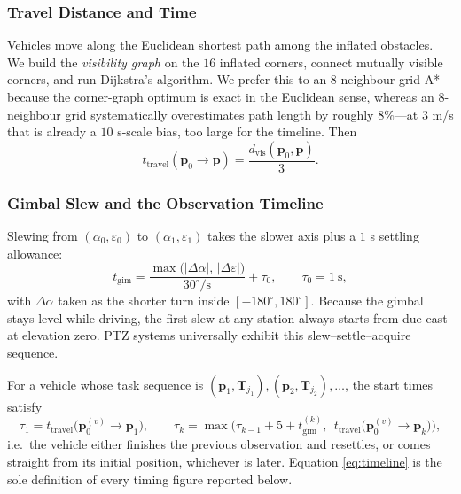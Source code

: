 \documentclass[12pt]{article}
\begin{document}
\subsubsection{Travel Distance and Time}

Vehicles move along the Euclidean shortest path among the inflated obstacles. We build the \emph{visibility graph} on the $16$ inflated corners, connect mutually visible corners, and run Dijkstra's algorithm\cite{dijkstra1959,lozano1979,kapoor1988vis}. We prefer this to an $8$-neighbour grid A* because the corner-graph optimum is exact in the Euclidean sense, whereas an $8$-neighbour grid systematically overestimates path length by roughly $8\%$---at $3$ m/s that is already a $10$ s-scale bias, too large for the timeline. Then
\begin{equation}
\label{eq:travel}
t_{\mathrm{travel}}(\bm p_0\to\bm p)=\frac{d_{\mathrm{vis}}(\bm p_0,\bm p)}{3}.
\end{equation}

\subsubsection{Gimbal Slew and the Observation Timeline}

Slewing from $(\alpha_0,\varepsilon_0)$ to $(\alpha_1,\varepsilon_1)$ takes the slower axis plus a $1$ s settling allowance:
\begin{equation}
\label{eq:gimbal}
t_{\mathrm{gim}}=\frac{\max\big(|\Delta\alpha|,\,|\Delta\varepsilon|\big)}{30^\circ/\mathrm{s}}+\tau_0,
\qquad \tau_0=1\ \mathrm{s},
\end{equation}
with $\Delta\alpha$ taken as the shorter turn inside $[-180^\circ,180^\circ]$. Because the gimbal stays level while driving, the first slew at any station always starts from due east at elevation zero. PTZ systems universally exhibit this slew--settle--acquire sequence\cite{kumar2009ptz,sasiadek2008vision}.

For a vehicle whose task sequence is $(\bm p_1,\bm T_{j_1}),(\bm p_2,\bm T_{j_2}),\dots$, the start times satisfy
\begin{equation}
\label{eq:timeline}
\tau_1=t_{\mathrm{travel}}\big(\bm p_0^{(v)}\to\bm p_1\big),\qquad
\tau_k=\max\Big(\tau_{k-1}+5+t_{\mathrm{gim}}^{(k)},\ \ t_{\mathrm{travel}}\big(\bm p_0^{(v)}\to\bm p_k\big)\Big),
\end{equation}
i.e.\ the vehicle either finishes the previous observation and resettles, or comes straight from its initial position, whichever is later. Equation \eqref{eq:timeline} is the sole definition of every timing figure reported below.
\end{document}

